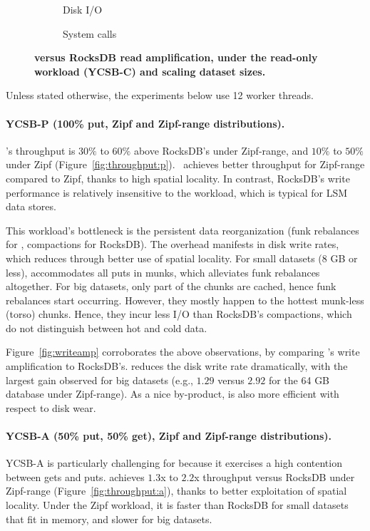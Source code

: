 \begin{figure}
\centering
\hspace{0.05\linewidth}
\begin{subfigure}{0.3\linewidth}
\caption{Disk I/O}
\label{fig:readamp:d}
\end{subfigure}
\hspace{0.05\linewidth}
\begin{subfigure}{0.3\linewidth}
\caption{System calls}
\label{fig:readamp:k}
\end{subfigure}
\caption{\bf{\sys\/ versus RocksDB read amplification, under the read-only workload (YCSB-C) and scaling dataset sizes.}}
\label{fig:readamp}
\end{figure}

Unless stated otherwise, the experiments below use 12 worker threads. 

\paragraph{YCSB-P (100\% put, Zipf and Zipf-range distributions).} 
\sys's throughput is $30\%$ to $60\%$ above RocksDB's under Zipf-range, 
and $10\%$ to $50\%$ under Zipf (Figure~\ref{fig:throughput:p}). 
\sys\ achieves better throughput for Zipf-range compared to Zipf, 
thanks to high spatial locality. In contrast, RocksDB's write performance 
is relatively insensitive to the workload, which is typical for LSM data stores.

This workload's bottleneck is the persistent data reorganization 
(funk rebalances for \sys, compactions for RocksDB). The overhead
manifests in disk write rates, which \sys\/ reduces through better use of spatial locality. 
For small datasets (8 GB or less), \sys\/ accommodates all puts in munks, which alleviates 
funk rebalances altogether. For big datasets, only part of the chunks are cached, hence 
funk rebalances start occurring. However, they mostly happen to the hottest munk-less 
(torso) chunks. Hence, they incur less I/O than RocksDB's compactions, which do not 
distinguish between hot and cold data. 

Figure~\ref{fig:writeamp} corroborates the above observations, by comparing 
\sys's write amplification to RocksDB's. \sys\/ reduces the disk write rate dramatically, 
with the largest gain observed for big datasets (e.g., $1.29$ versus $2.92$ for the 64 GB 
database under Zipf-range). As a nice by-product, \sys\/ is also more 
efficient with respect to disk wear.  

\paragraph{YCSB-A (50\% put, 50\% get), Zipf and Zipf-range distributions).}
YCSB-A  is particularly challenging for \sys\/ because it exercises a high contention between gets and puts. 
\sys\/ achieves $1.3$x to $2.2$x throughput versus RocksDB under Zipf-range (Figure~\ref{fig:throughput:a}), 
thanks to better exploitation of spatial locality. Under the Zipf workload, it is faster than RocksDB for small
datasets that fit in memory, and slower for big datasets.  

